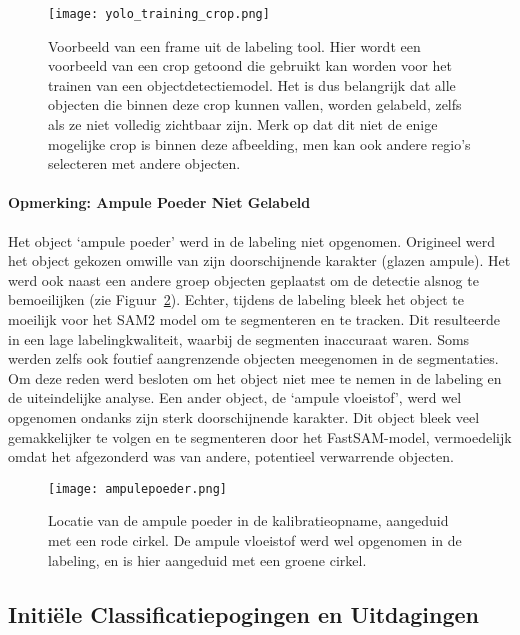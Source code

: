 \begin{figure}[H]
    \centering
    \texttt{[image: yolo\_training\_crop.png]}
    \caption[Voorbeeld van een crop voor objectdetectie]{
        \label{fig:voorbeeld_crop_yolo_training}
        Voorbeeld van een frame uit de labeling tool. 
        Hier wordt een voorbeeld van een crop getoond die gebruikt kan worden voor het trainen van een objectdetectiemodel.
        Het is dus belangrijk dat alle objecten die binnen deze crop kunnen vallen,
        worden gelabeld, zelfs als ze niet volledig zichtbaar zijn.
        Merk op dat dit niet de enige mogelijke crop is binnen deze afbeelding, men kan ook andere regio's selecteren met andere objecten.
    }
\end{figure}

\paragraph{Opmerking: Ampule Poeder Niet Gelabeld}
Het object `ampule poeder' werd in de labeling niet opgenomen. 
Origineel werd het object gekozen omwille van zijn doorschijnende karakter (glazen ampule).
Het werd ook naast een andere groep objecten geplaatst om de detectie alsnog te bemoeilijken (zie Figuur~\ref{fig:ampulepoeder}).
Echter, tijdens de labeling bleek het object te moeilijk voor het SAM2 model om te segmenteren en te tracken.
Dit resulteerde in een lage labelingkwaliteit, waarbij de segmenten inaccuraat waren.
Soms werden zelfs ook foutief aangrenzende objecten meegenomen in de segmentaties.
Om deze reden werd besloten om het object niet mee te nemen in de labeling en de uiteindelijke analyse. 
Een ander object, de `ampule vloeistof', werd wel opgenomen ondanks zijn sterk doorschijnende karakter.
Dit object bleek veel gemakkelijker te volgen en te segmenteren door het FastSAM-model, vermoedelijk omdat het afgezonderd was van andere, 
potentieel verwarrende objecten.

\begin{figure}[H]
    \centering
    \texttt{[image: ampulepoeder.png]}
    \caption[Voorbeeld van de ampule poeder in de kalibratieopname]{
        \label{fig:ampulepoeder}
        Locatie van de ampule poeder in de kalibratieopname, aangeduid met een rode cirkel.
        De ampule vloeistof werd wel opgenomen in de labeling, en is hier aangeduid met een groene cirkel.
    }
\end{figure}

\subsection{Initiële Classificatiepogingen en Uitdagingen}

